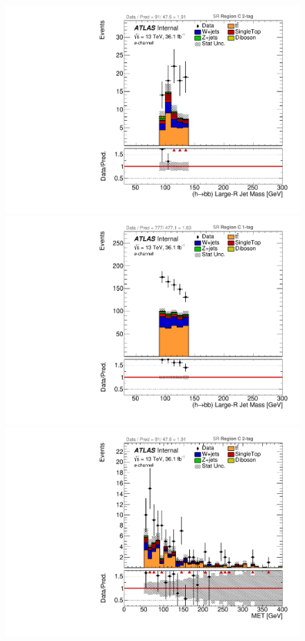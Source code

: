 \begin{figure}[!htbp]
\begin{center}
\includegraphics[scale=0.23]{./figures/boosted/ABCD/elec_SR_RegionC_HbbMass}
\includegraphics[scale=0.23]{./figures/boosted/ABCD/elec_SR_RegionC_1tag_HbbMass}\\
\includegraphics[scale=0.23]{./figures/boosted/ABCD/elec_SR_RegionC_MET}

\end{center}
\end{figure}
